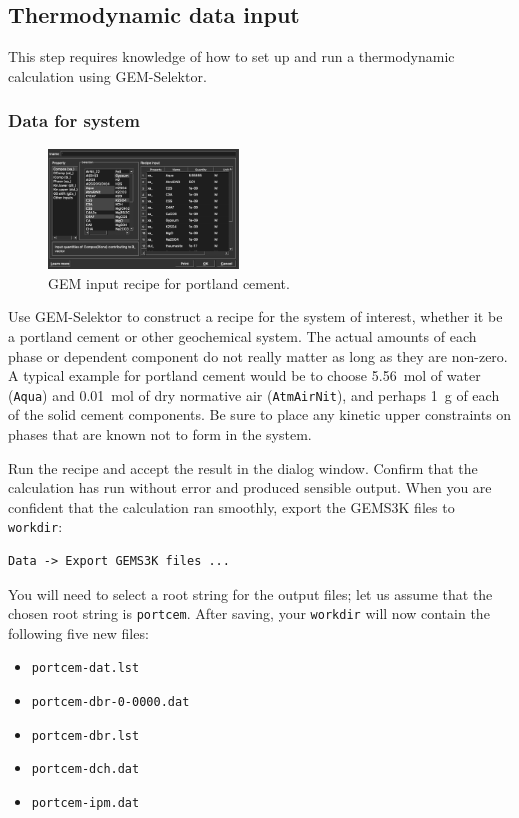 \documentclass{article}
\begin{document}
\subsection{Thermodynamic data input}
This step requires knowledge of how to set up and run a thermodynamic calculation using
GEM-Selektor.

\subsubsection{Data for system}
\begin{figure}
    \centering\includegraphics[width=0.45\textwidth]{Figures/GEMrecipe01.png}
    \caption{GEM input recipe for portland cement.}
\end{figure}

Use GEM-Selektor to construct a recipe for the system of interest, whether it be a portland
cement or other geochemical system.  The actual amounts of each phase or dependent component
do not really matter as long as they are non-zero.  A typical example for portland cement
would be to choose
\SI{5.56}{\mole} of water (\verb!Aqua!) and \SI{0.01}{\mole} of dry normative
air (\verb!AtmAirNit!), and perhaps \SI{1}{\gram} of each of the solid cement
components.  Be sure to place any kinetic upper constraints on phases that are known not to
form in the system.

Run the recipe and accept the result in the dialog window.  Confirm
that the calculation has run without error and produced sensible output.  When you are
confident that the calculation ran smoothly, export the GEMS3K files to \verb!workdir!:
\begin{verbatim}
Data -> Export GEMS3K files ...
\end{verbatim}
You will need to select a root string for the output files; let us assume that the chosen
root string is \verb!portcem!.  After saving, your \verb!workdir! will now contain the
following five new files:
\begin{itemize}
    \item \verb!portcem-dat.lst!
    \item \verb!portcem-dbr-0-0000.dat!
    \item \verb!portcem-dbr.lst!
    \item \verb!portcem-dch.dat!
    \item \verb!portcem-ipm.dat!
\end{itemize}
\end{document}
